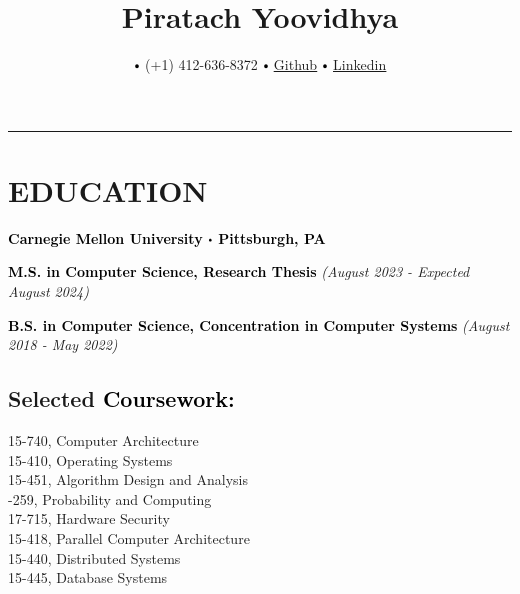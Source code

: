 \documentclass[10pt]{article}
\title{\bfseries\Huge Piratach Yoovidhya}
\author{
  \small \myemail
   $\sbullet[.75]$
   (+1) 412-636-8372
   $\sbullet[.75]$
   \href{https://github.com/Piratach}{\underline{Github}}
   $\sbullet[.75]$
  \href{https://www.linkedin.com/in/piratach-yoovidhya/}
  {\underline{Linkedin}}
}
\date{}
\newcommand\sbullet[1][.5]{\mathbin{\vcenter{\hbox{\scalebox{#1}{$\bullet$}}}}}
\begin{document}
  \maketitle
  \thispagestyle{empty}
  \vspace*{-1.0cm}
  \hrule
  \vspace*{-0.15cm}

  \section*{\large \textcolor{lighterB}{EDUCATION}}
  \vspace*{-0.3cm}

  \textbf{\large \textcolor{Black}{Carnegie Mellon University $\sbullet$ Pittsburgh, PA}}

  \vspace{0.05cm}

\textcolor{Black}{\textbf{M.S. in Computer Science, Research Thesis}} \hfill \textit{(August 2023 - Expected August 2024)}

  \vspace{0.05cm}

\textcolor{Black}{\textbf{B.S. in Computer Science, Concentration in Computer Systems}} \hfill \textit{(August 2018 - May 2022)}

  \vspace{0.2cm}

  \vspace*{-0.5cm}

  \subsection*{Selected \textcolor{Black}{Coursework:}}

    \vspace*{-0.55cm}
    \begin{multicols}{2}
       15-740, Computer Architecture \\
       15-410, Operating Systems \\
       15-451, Algorithm Design and Analysis \\
       -259, Probability and Computing \\
       17-715, Hardware Security \\
       15-418, Parallel Computer Architecture \\
       15-440, Distributed Systems \\
       15-445, Database Systems
    \end{multicols}
\end{document}
